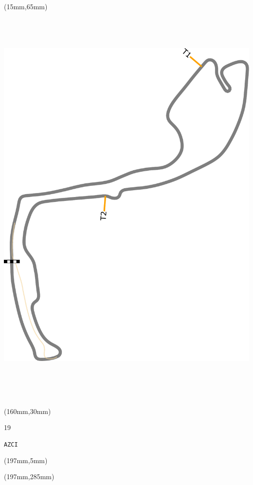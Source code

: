 \begin{textblock*}{185mm}(15mm,65mm)%
\centering
\mbox{\includegraphics[width=185mm,height=210mm,keepaspectratio]{PT/AZCI.pdf}}
\end{textblock*}
\begin{textblock*}{40mm}(160mm,30mm)%
\Large
\par{} 
\par19 
\par\hfill\tiny\tt AZCI\\
\end{textblock*}
\begin{textblock*}{20mm}(197mm,5mm)%
\fbox{\thepage}
\label{AZCI}
\end{textblock*}
\begin{textblock*}{20mm}(197mm,285mm)%
\fbox{\thepage}
\end{textblock*}

